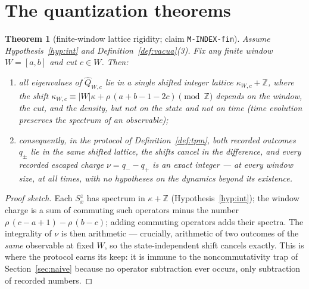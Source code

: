 \documentclass[11pt]{article}
\newtheorem{theorem}{Theorem}[section]
\theoremstyle{definition}
\theoremstyle{remark}
\newcommand{\Z}{\mathbb{Z}}
\begin{document}
\section{The quantization theorems}\label{sec:main}

\begin{theorem}[finite-window lattice rigidity; claim \texttt{M-INDEX-fin}]
\label{thm:fin}
Assume Hypothesis~\ref{hyp:int} and Definition~\ref{def:vacua}(3).  Fix any
finite window $W=[a,b]$ and cut $c\in W$.  Then:
\begin{enumerate}
\item all eigenvalues of $\widehat{Q}_{W,c}$ lie in a single shifted integer
lattice $\kappa_{W,c}+\Z$, where the shift
$\kappa_{W,c}\equiv|W|\kappa+\rho\,(a+b-1-2c) \pmod{\Z}$ depends on the
window, the cut, and the density, but \emph{not} on the state and \emph{not}
on time (time evolution preserves the spectrum of an observable);
\item consequently, in the protocol of Definition~\ref{def:tpm}, both
recorded outcomes $q_\pm$ lie in the \emph{same} shifted lattice, the shifts
cancel in the difference, and every recorded escaped charge $\nu=q_--q_+$ is
an exact integer --- at every window size, at all times, with no hypotheses
on the dynamics beyond its existence.
\end{enumerate}
\end{theorem}

\begin{proof}[Proof sketch]
Each $S^z_x$ has spectrum in $\kappa+\Z$ (Hypothesis~\ref{hyp:int}); the
window charge is a sum of commuting such operators minus the number
$\rho\,(c-a+1)-\rho\,(b-c)$; adding commuting operators adds their spectra.
The integrality of $\nu$ is then arithmetic --- crucially, arithmetic of two
outcomes of the \emph{same} observable at fixed $W$, so the state-independent
shift cancels exactly.  This is where the protocol earns its keep: it is
immune to the noncommutativity trap of Section~\ref{sec:naive} because no
operator subtraction ever occurs, only subtraction of recorded numbers.
\end{proof}
\end{document}
